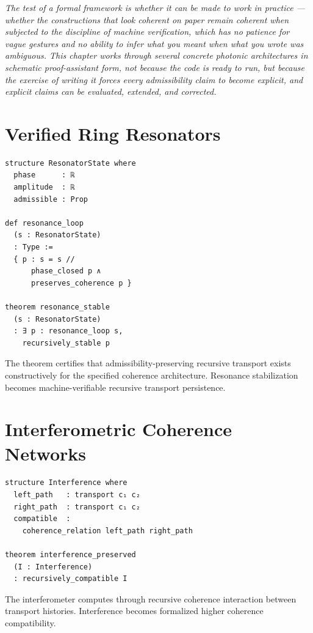 \documentclass[11pt,openany]{book}
\theoremstyle{definition}
\theoremstyle{plain}
\begin{document}
\noindent\textit{The test of a formal framework is whether it can be made to work in practice --- whether the constructions that look coherent on paper remain coherent when subjected to the discipline of machine verification, which has no patience for vague gestures and no ability to infer what you meant when what you wrote was ambiguous. This chapter works through several concrete photonic architectures in schematic proof-assistant form, not because the code is ready to run, but because the exercise of writing it forces every admissibility claim to become explicit, and explicit claims can be evaluated, extended, and corrected.}

\bigskip

\section{Verified Ring Resonators}

\begin{verbatim}
structure ResonatorState where
  phase      : ℝ
  amplitude  : ℝ
  admissible : Prop

def resonance_loop
  (s : ResonatorState)
  : Type :=
  { p : s = s //
      phase_closed p ∧
      preserves_coherence p }

theorem resonance_stable
  (s : ResonatorState)
  : ∃ p : resonance_loop s,
    recursively_stable p
\end{verbatim}

The theorem certifies that admissibility-preserving recursive transport exists constructively for the specified coherence architecture. Resonance stabilization becomes machine-verifiable recursive transport persistence.

\section{Interferometric Coherence Networks}

\begin{verbatim}
structure Interference where
  left_path   : transport c₁ c₂
  right_path  : transport c₁ c₂
  compatible  :
    coherence_relation left_path right_path

theorem interference_preserved
  (I : Interference)
  : recursively_compatible I
\end{verbatim}

The interferometer computes through recursive coherence interaction between transport histories. Interference becomes formalized higher coherence compatibility.
\end{document}
